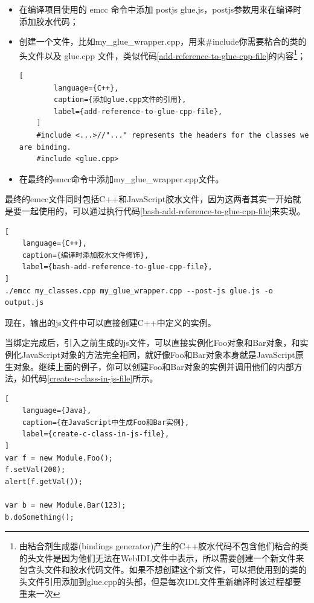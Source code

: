 \begin{itemize}[itemindent=2em]
    \item 在编译项目使用的 emcc 命令中添加 \text{--}post\text{-}js glue.js，post\text{-}js参数用来在编译时添加胶水代码；
    \item 创建一个文件，比如my\_glue\_wrapper.cpp，用来\#include你需要粘合的类的头文件以及 glue.cpp 文件，类似代码\ref{add-reference-to-glue-cpp-file}的内容\footnote{由粘合剂生成器(bindings generator)产生的C++胶水代码不包含他们粘合的类的头文件是因为他们无法在WebIDL文件中表示，所以需要创建一个新文件来包含头文件和胶水代码文件。如果不想创建这个新文件，可以把使用到的类的头文件引用添加到glue.cpp的头部，但是每次IDL文件重新编译时该过程都要重来一次}；

    \begin{lstlisting}[
        language={C++},
        caption={添加glue.cpp文件的引用},
        label={add-reference-to-glue-cpp-file},
    ]
    #include <...>//"..." represents the headers for the classes we are binding.
    #include <glue.cpp>
    \end{lstlisting}

    \item 在最终的emcc命令中添加my\_glue\_wrapper.cpp文件。

\end{itemize}

最终的emcc文件同时包括C++和JavaScript胶水文件，因为这两者其实一开始就是要一起使用的，可以通过执行代码\ref{bash-add-reference-to-glue-cpp-file}来实现。
\begin{lstlisting}[
    language={C++},
    caption={编译时添加胶水文件修饰},
    label={bash-add-reference-to-glue-cpp-file},
]
./emcc my_classes.cpp my_glue_wrapper.cpp --post-js glue.js -o output.js
\end{lstlisting}

现在，输出的js文件中可以直接创建C++中定义的实例。

当绑定完成后，引入之前生成的js文件，可以直接实例化Foo对象和Bar对象，和实例化JavaScript对象的方法完全相同，就好像Foo和Bar对象本身就是JavaScript原生对象。继续上面的例子，你可以创建Foo和Bar对象的实例并调用他们的内部方法，如代码\ref{create-c-class-in-js-file}所示。


\begin{lstlisting}[
    language={Java},
    caption={在JavaScript中生成Foo和Bar实例},
    label={create-c-class-in-js-file},
]
var f = new Module.Foo();
f.setVal(200);
alert(f.getVal());

var b = new Module.Bar(123);
b.doSomething();
\end{lstlisting}

